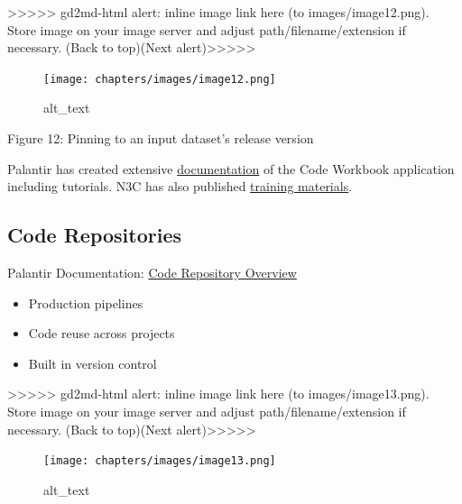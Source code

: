 \documentclass[
  letterpaper,
  DIV=11,
  numbers=noendperiod]{scrreprt}
\providecommand{\tightlist}{%
  \setlength{\itemsep}{0pt}\setlength{\parskip}{0pt}}\usepackage{longtable,booktabs,array}
\begin{document}
{\textgreater\textgreater\textgreater\textgreater\textgreater{}
gd2md-html alert: inline image link here (to images/image12.png). Store
image on your image server and adjust path/filename/extension if
necessary. }(Back to top)(Next
alert){\textgreater\textgreater\textgreater\textgreater\textgreater{} }

\begin{figure}

{\centering \texttt{[image: chapters/images/image12.png]}

}

\caption{alt\_text}

\end{figure}

Figure 12: Pinning to an input dataset's release version

Palantir has created extensive
\href{https://www.palantir.com/docs/foundry/code-workbook/overview/}{documentation}
of the Code Workbook application including tutorials. N3C has also
published
\href{https://unite.nih.gov/workspace/module/view/latest/ri.workshop.main.module.e7b83a8c-545e-49ac-8714-f34bfa7f7767?view=focus\&Id=22}{training
materials}.

\hypertarget{code-repositories}{%
\subsection{Code Repositories}\label{code-repositories}}

Palantir Documentation:
\href{https://www.palantir.com/docs/foundry/code-repositories/overview/}{Code
Repository Overview}

\begin{itemize}
\tightlist
\item
  Production pipelines
\item
  Code reuse across projects
\item
  Built in version control
\end{itemize}

{\textgreater\textgreater\textgreater\textgreater\textgreater{}
gd2md-html alert: inline image link here (to images/image13.png). Store
image on your image server and adjust path/filename/extension if
necessary. }(Back to top)(Next
alert){\textgreater\textgreater\textgreater\textgreater\textgreater{} }

\begin{figure}

{\centering \texttt{[image: chapters/images/image13.png]}

}

\caption{alt\_text}

\end{figure}
\end{document}
